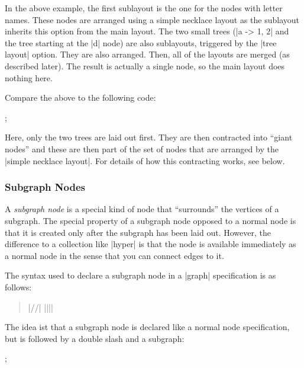 In the above example, the first sublayout is the one for the nodes with letter
names. These nodes are arranged using a simple necklace layout as the sublayout
inherits this option from the main layout. The two small trees (|a -> {1, 2}|
and the tree starting at the |d| node) are also sublayouts, triggered by the
|tree layout| option. They are also arranged. Then, all of the layouts are
merged (as described later). The result is actually a single node, so the main
layout does nothing here.

Compare the above to the following code:
%
\begin{codeexample}[preamble={\usetikzlibrary{graphs,graphdrawing}
\usegdlibrary{circular,trees}}]
\tikz {};
\end{codeexample}

Here, only the two trees are laid out first. They are then contracted into
``giant nodes'' and these are then part of the set of nodes that are arranged
by the |simple necklace layout|. For details of how this contracting works, see
below.


\subsubsection{Subgraph Nodes}

A \emph{subgraph node} is a special kind of node that ``surrounds'' the
vertices of a subgraph. The special property of a subgraph node opposed to a
normal node is that it is created only after the subgraph has been laid out.
However, the difference to a collection like |hyper| is that the node is
available immediately as a normal node in the sense that you can connect edges
to it.

The syntax used to declare a subgraph node in a |graph| specification is as
follows:
%
\begin{quote}
     |//|  |{||}|
\end{quote}

The idea ist that a subgraph node is declared like a normal node specification,
but is followed by a double slash and a subgraph:
%
\begin{codeexample}[
    width=5cm,
    preamble={\usetikzlibrary{graphs,graphdrawing}
\usegdlibrary{circular,trees}},
]
\tikz {};
\end{codeexample}

